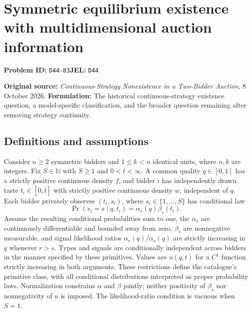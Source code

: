 \documentclass[11pt,a4paper]{article}
\newcommand{\N}{\mathbb N}
\begin{document}
\section*{Symmetric equilibrium existence with multidimensional auction information}
\textbf{Problem ID:} \texttt{D44-83}\quad \textbf{JEL:} \texttt{D44}\par
\label{problem:OP-0592}
\label{supp:auction-existence}

\noindent\textbf{Original source:} \emph{Continuous-Strategy Nonexistence
	in a Two-Bidder Auction}, 8 October 2026.
\textbf{Formulation:} The historical continuous-strategy existence
question, a model-specific classification, and the broader question
remaining after removing strategy continuity.

\subsection*{Definitions and assumptions}

Consider $n\ge2$ symmetric bidders and $1\le k<n$ identical units,
where $n,k$ are integers. Fix $S\in\N$ with $S\ge1$ and
$0<\bar t<\infty$.
A common quality $q\in[0,1]$ has a strictly positive continuous
density $f$, and bidder $i$ has independently drawn taste
$t_i\in[0,\bar t]$ with strictly positive continuous density $w$,
independent of $q$. Each bidder privately observes $(t_i,s_i)$,
where $s_i\in\{1,\ldots,S\}$ has conditional law
\[
\Pr(s_i=s\mid q,t_i)=\alpha_s(q)\beta_s(t_i).
\]
Assume the resulting conditional probabilities sum to one, the
$\alpha_s$ are continuously differentiable and bounded away from zero,
$\beta_s$ are nonnegative measurable, and signal likelihood ratios
$\alpha_r(q)/\alpha_s(q)$ are strictly increasing in $q$ whenever
$r>s$. Types and signals are conditionally independent across bidders
in the manner specified by these primitives. Values are
$u(q,t)$ for a $C^1$ function strictly increasing in both arguments.
These restrictions define the catalogue's primitive class, with all
conditional distributions interpreted as proper probability laws.
Normalization constrains $\alpha$ and $\beta$ jointly; neither
positivity of $\beta_s$ nor nonnegativity of $u$ is imposed.
The likelihood-ratio condition is vacuous when $S=1$.
\end{document}

